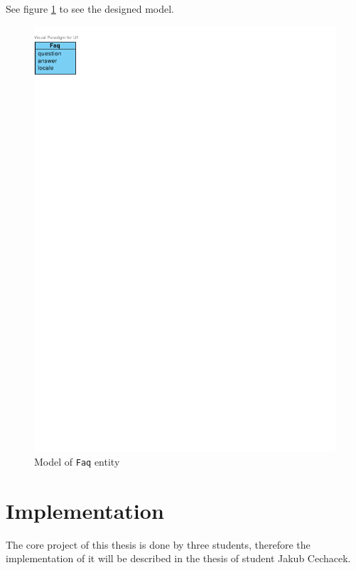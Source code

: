 See figure \ref{fig:domain-faq-entity} to see the designed model.

\begin{figure}[h]
    \centering
        \includegraphics[trim=0 740 510 30, clip, keepaspectratio]{./images/domain-faq-entity.pdf}
    \caption{Model of \texttt{Faq} entity}
    \label{fig:domain-faq-entity}
\end{figure}

\section{Implementation}

The core project of this thesis is done by three students, therefore the implementation of it will be described in the thesis of student Jakub Cechacek.